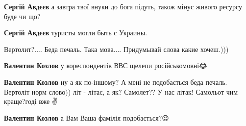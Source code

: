\begin{itemize}
\begin{itemize}
\textbf{Сергій Авдєєв} а завтра твої внуки до бога підуть, також мінус живого ресурсу буде чи що?

 
\textbf{Сергій Авдєєв} туристы могли быть с Украины.

\end{itemize}

 
Вертолит?.... Беда печаль. Така мова.... Придумывай слова какие хочеш.)))

\begin{itemize}
 
\textbf{Валентин Козлов} у кореспондентів ВВС щелепи російськомовні😂

 
\textbf{Валентин Козлов} ну а як по-іншому? А мені не подобається беда печаль. Вертоліт норм слово)) літ - літає, а як? Самолет?? У нас літак! Самольот чим краще?\Laughey[1.0][white] годі вже ✌\Laughey[1.0][white]

 
\textbf{Валентин Козлов} а Вам Ваша фамілія подобається?😉\Laughey[1.0][white]

 

\end{itemize}
\end{itemize}
